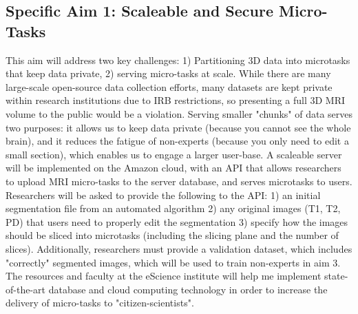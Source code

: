 \subsection*{Specific Aim 1: Scaleable and Secure Micro-Tasks}

This aim will address two key challenges: 1) Partitioning 3D data into microtasks that keep data private, 2) serving micro-tasks at scale. While there are many large-scale open-source data collection efforts, many datasets are kept private within research institutions due to  IRB restrictions, so presenting a full 3D MRI volume to the public would be a violation. Serving smaller "chunks" of data serves two purposes: it allows us to keep data private (because you cannot see the whole brain), and it reduces the fatigue of non-experts (because you only need to edit a small section), which enables us to engage a larger user-base. A scaleable server will be implemented on the Amazon cloud, with an API that allows researchers to upload MRI micro-tasks to the server database, and serves microtasks to users. Researchers will be asked to provide the following to the API: 1) an initial segmentation file from an automated algorithm 2) any original images (T1, T2, PD) that users need to properly edit the segmentation 3) specify how the images should be sliced into microtasks (including the slicing plane and the number of slices). Additionally, researchers must provide a validation dataset, which includes "correctly" segmented images, which will be used to train non-experts in aim 3. The resources and faculty at the eScience institute will help me implement state-of-the-art database and cloud computing technology in order to increase the delivery of micro-tasks to "citizen-scientists".